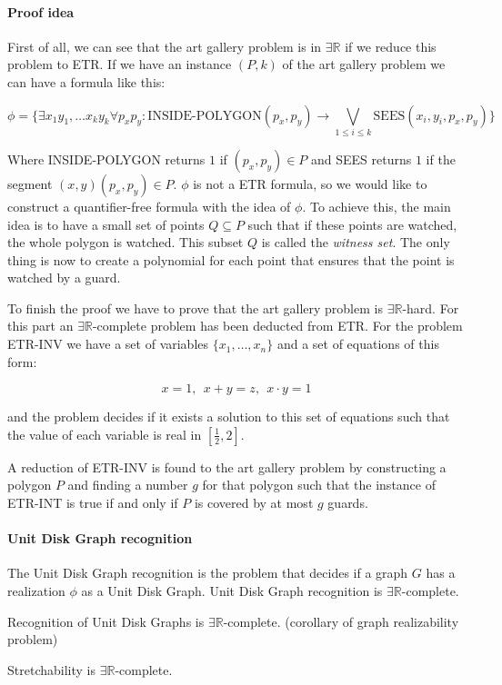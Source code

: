 \paragraph{Proof idea} First of all, we can see that the art gallery problem
is in $\exists \mathbb{R}$ if we reduce this problem to ETR. If we have an
instance $(P,k)$ of the art gallery problem we can have a formula
\cite{EFRAT2006238} like this:

$$\phi = \{\exists x_1y_1,\dots x_ky_k \forall p_xp_y :
\text{INSIDE-POLYGON}(p_x,p_y) \to \bigvee_{1 \leq i \leq k}
\text{SEES}(x_i,y_i,p_x,p_y)\}$$

Where INSIDE-POLYGON returns $1$ if $(p_x,p_y) \in P$ and SEES returns $1$ if
the segment $(x,y)(p_x,p_y) \in P$. $\phi$ is not a ETR formula, so we would like
to construct a quantifier-free formula with the idea of $\phi$. To achieve this,
the main idea is to have a small set of points $Q \subseteq P$ such that if these
points are watched, the whole polygon is watched. This subset $Q$ is called
the \textit{witness set}. The only thing is now to create a polynomial for each
point that ensures that the point is watched by a guard.

To finish the proof we have to prove that the art gallery problem is $\exists
\mathbb{R}$-hard. For this part an $\exists \mathbb{R}$-complete
problem has been deducted from ETR. For the problem ETR-INV we have a set of
variables $\{x_1,\dots,x_n\}$ and a set of equations of this form:

$$x = 1,\ \ x + y = z,\ \ x \cdot y = 1 $$

and the problem decides if it exists a solution to this set of equations such
that the value of each variable is real in $[\frac{1}{2},2]$.

A reduction of ETR-INV is found to the art gallery problem by constructing
a polygon $P$ and finding a number $g$ for that polygon such that the instance
of ETR-INT is true if and only if $P$ is covered by at most $g$ guards.

\paragraph{Unit Disk Graph recognition} The Unit Disk Graph recognition is
the problem that decides if a graph $G$ has a realization $\phi$ as a Unit
Disk Graph. Unit Disk Graph recognition is $\exists \mathbb{R}$-complete.

Recognition of Unit Disk Graphs is $\exists \mathbb{R}$-complete. (corollary of graph realizability problem)\cite{Schaefer2013}

Stretchability is $\exists \mathbb{R}$-complete.
